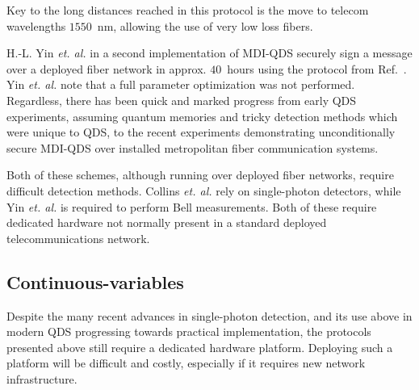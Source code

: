 Key to the long distances reached in this protocol is the move to telecom wavelengths $1550$~nm, allowing the use of very low loss fibers. 



H.-L. Yin \emph{et. al.} in a second implementation of MDI-QDS \cite{Yin2017} securely sign a message over a deployed fiber network in approx. $40$~hours using the protocol from Ref.~\cite{Puthoor2016}. Yin \emph{et. al.} note that a full parameter optimization was not performed. Regardless, there has been quick and marked progress from early QDS experiments, assuming quantum memories and tricky detection methods which were unique to QDS, to the recent experiments demonstrating unconditionally secure MDI-QDS over installed metropolitan fiber communication systems.

Both of these schemes, although running over deployed fiber networks, require difficult detection methods. Collins \emph{et. al.} \cite{Collins2016} rely on single-photon detectors, while Yin \emph{et. al.} \cite{Yin2017} is required to perform Bell measurements. Both of these require dedicated hardware not normally present in a standard deployed telecommunications network.









\subsection{Continuous-variables}

Despite the many recent advances in single-photon detection, and its use above in modern QDS progressing towards practical implementation, the protocols presented above still require a dedicated hardware platform. Deploying such a platform will be difficult and costly, especially if it requires new network infrastructure.

